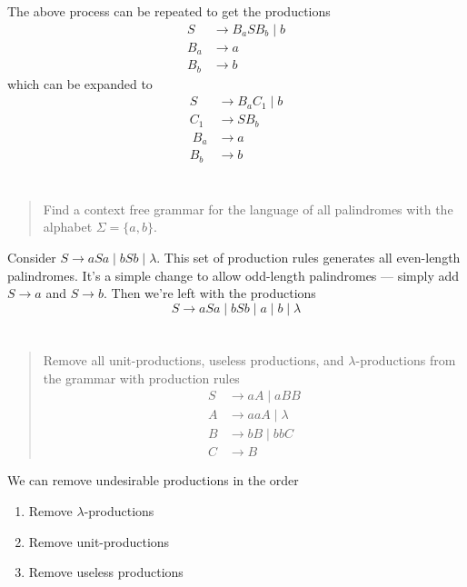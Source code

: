 \documentclass{article}
\begin{document}
The above process can be repeated to get the productions
\begin{align*}
    S   & \to B_a S B_b \mid b \\
    B_a & \to a                \\
    B_b & \to b
\end{align*}
which can be expanded to
\begin{align*}
    S   & \to B_a C_1 \mid b \\
    C_1 & \to S B_b          \\\
    B_a & \to a              \\
    B_b & \to b
\end{align*}

\section{}
\begin{quote}
    Find a context free grammar for the language of all palindromes with the alphabet $\Sigma = \{a, b\}$.
\end{quote}

Consider $S \to aSa \mid bSb \mid \lambda$.
This set of production rules generates all even-length palindromes.
It's a simple change to allow odd-length palindromes --- simply add $S \to a$ and $S \to b$.
Then we're left with the productions
\[S \to aSa \mid bSb \mid a \mid b \mid \lambda \]

\section{}
\begin{quote}
    Remove all unit-productions, useless productions, and $\lambda$-productions from the grammar with production rules
    \begin{align*}
        S & \to aA \mid aBB      \\
        A & \to aaA \mid \lambda \\
        B & \to bB \mid bbC      \\
        C & \to B
    \end{align*}
\end{quote}

We can remove undesirable productions in the order
\begin{enumerate}
    \item Remove $\lambda$-productions
    \item Remove unit-productions
    \item Remove useless productions
\end{enumerate}
\end{document}
